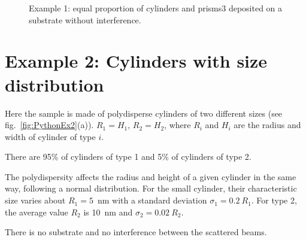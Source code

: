 \begin{figure}[H]
\hfill
{}
\hfill
{}
\hfill
\caption{Example 1: equal proportion of cylinders and prisms3 deposited on a substrate without interference.}
\label{fig:PythonEx1}
\end{figure}

\newpage
\section{Example 2: Cylinders with size distribution} 
Here the sample is made of polydisperse cylinders of two different sizes (see fig.~\ref{fig:PythonEx2}(a)). $R_1=H_1$, $R_2=H_2$, where $R_i$ and $H_i$ are the radius and width of cylinder of type $i$.  

There are 95\% of cylinders of type 1 and 5\% of cylinders of type 2.

The polydispersity affects the radius and height of a given cylinder in the same way, following a normal distribution. For the small cylinder, their characteristic size varies about $R_1=5$~nm with a standard deviation $\sigma_1=0.2\ R_1$. For type 2, the average value $R_2$ is 10~nm and $\sigma_2=0.02\ R_2$. 

There is no substrate and no interference between the scattered beams.

